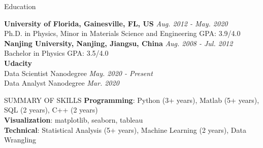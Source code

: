 \documentclass{resume} %
\begin{document}
\vspace{-1em}
\begin{rSection}{Education}

{\bf University of Florida, Gainesville, FL, US} \hfill  {\em Aug. 2012 - May. 2020} 
\\ Ph.D. in Physics, Minor in Materials Science and Engineering \hfill GPA: 3.9/4.0
\\{\bf Nanjing University, Nanjing, Jiangsu, China} \hfill  {\em Aug. 2008 - Jul. 2012} 
\\ Bachelor in Physics \hfill GPA: 3.5/4.0
\\{\bf Udacity}
\\ Data Scientist Nanodegree \hfill {\em May. 2020 - Present} 
\\ Data Analyst Nanodegree \hfill  {\em Mar. 2020}


\end{rSection}


\vspace{-9pt}
\begin{rSection}{SUMMARY OF SKILLS}\itemsep -3pt
\vspace{-3pt}
\textbf{Programming}: Python (3+ years), Matlab (5+ years), SQL (2 years), C++ (2 years)
\\
\textbf{Visualization}: matplotlib, seaborn, tableau
\\
\textbf{Technical}: Statistical Analysis (5+ years), Machine Learning (2 years), Data Wrangling
\end{rSection}

\end{document}
